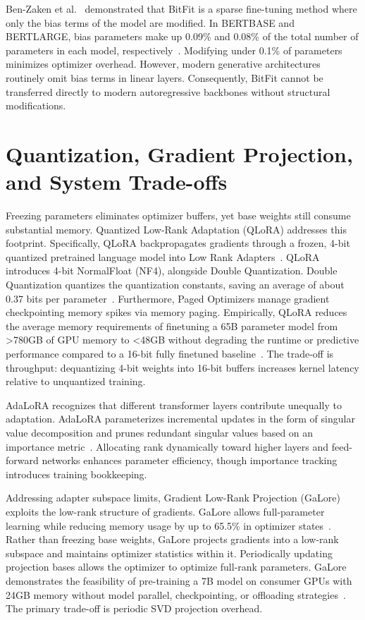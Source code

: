 \documentclass[11pt,a4paper]{article}
\begin{document}
Ben-Zaken et al.~\cite{benzaken2021bitfit} demonstrated that BitFit is a sparse fine-tuning method where only the bias terms of the model are modified. In BERTBASE and BERTLARGE, bias parameters make up 0.09\% and 0.08\% of the total number of parameters in each model, respectively~\cite{benzaken2021bitfit}. Modifying under 0.1\% of parameters minimizes optimizer overhead. However, modern generative architectures routinely omit bias terms in linear layers. Consequently, BitFit cannot be transferred directly to modern autoregressive backbones without structural modifications.

\section{Quantization, Gradient Projection, and System Trade-offs}

Freezing parameters eliminates optimizer buffers, yet base weights still consume substantial memory. Quantized Low-Rank Adaptation (QLoRA) addresses this footprint. Specifically, QLoRA backpropagates gradients through a frozen, 4-bit quantized pretrained language model into Low Rank Adapters~\cite{dettmers2023qlora}. QLoRA introduces 4-bit NormalFloat (NF4), alongside Double Quantization. Double Quantization quantizes the quantization constants, saving an average of about 0.37 bits per parameter~\cite{dettmers2023qlora}. Furthermore, Paged Optimizers manage gradient checkpointing memory spikes via memory paging. Empirically, QLoRA reduces the average memory requirements of finetuning a 65B parameter model from >780GB of GPU memory to <48GB without degrading the runtime or predictive performance compared to a 16-bit fully finetuned baseline~\cite{dettmers2023qlora}. The trade-off is throughput: dequantizing 4-bit weights into 16-bit buffers increases kernel latency relative to unquantized training.

AdaLoRA recognizes that different transformer layers contribute unequally to adaptation. AdaLoRA parameterizes incremental updates in the form of singular value decomposition and prunes redundant singular values based on an importance metric~\cite{zhang2023adalora}. Allocating rank dynamically toward higher layers and feed-forward networks enhances parameter efficiency, though importance tracking introduces training bookkeeping.

Addressing adapter subspace limits, Gradient Low-Rank Projection (GaLore) exploits the low-rank structure of gradients. GaLore allows full-parameter learning while reducing memory usage by up to 65.5\% in optimizer states~\cite{zhao2024galore}. Rather than freezing base weights, GaLore projects gradients into a low-rank subspace and maintains optimizer statistics within it. Periodically updating projection bases allows the optimizer to optimize full-rank parameters. GaLore demonstrates the feasibility of pre-training a 7B model on consumer GPUs with 24GB memory without model parallel, checkpointing, or offloading strategies~\cite{zhao2024galore}. The primary trade-off is periodic SVD projection overhead.
\end{document}
